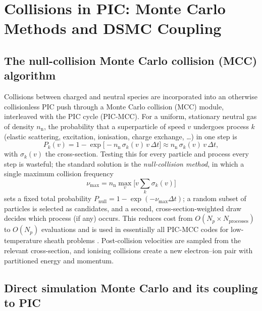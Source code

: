 \section{Collisions in PIC: Monte Carlo Methods and DSMC Coupling}

\subsection{The null-collision Monte Carlo collision (MCC) algorithm}

Collisions between charged and neutral species are incorporated into an otherwise collisionless PIC push through a Monte Carlo collision (MCC) module, interleaved with the PIC cycle (PIC-MCC). For a uniform, stationary neutral gas of density $n_{\mathrm{n}}$, the probability that a superparticle of speed $v$ undergoes process $k$ (elastic scattering, excitation, ionisation, charge exchange, \ldots) in one step is
\begin{equation}
P_{k}(v) = 1 - \exp\!\big[-n_{\mathrm{n}}\,\sigma_{k}(v)\,v\,\Delta t\big] \approx n_{\mathrm{n}}\,\sigma_{k}(v)\,v\,\Delta t,
\end{equation}
with $\sigma_{k}(v)$ the cross-section. Testing this for every particle and process every step is wasteful; the standard solution is the \emph{null-collision method}, in which a single maximum collision frequency
\begin{equation}
\nu_{\max} = n_{\mathrm{n}}\max_{v}\Big[v\sum_{k}\sigma_{k}(v)\Big]
\end{equation}
sets a fixed total probability $P_{\mathrm{null}}=1-\exp(-\nu_{\max}\Delta t)$; a random subset of particles is selected as candidates, and a second, cross-section-weighted draw decides which process (if any) occurs. This reduces cost from $O(N_{p}\times N_{\mathrm{processes}})$ to $O(N_{p})$ evaluations and is used in essentially all PIC-MCC codes for low-temperature sheath problems \cite{ref0637}. Post-collision velocities are sampled from the relevant cross-section, and ionising collisions create a new electron--ion pair with partitioned energy and momentum.

\subsection{Direct simulation Monte Carlo and its coupling to PIC}

